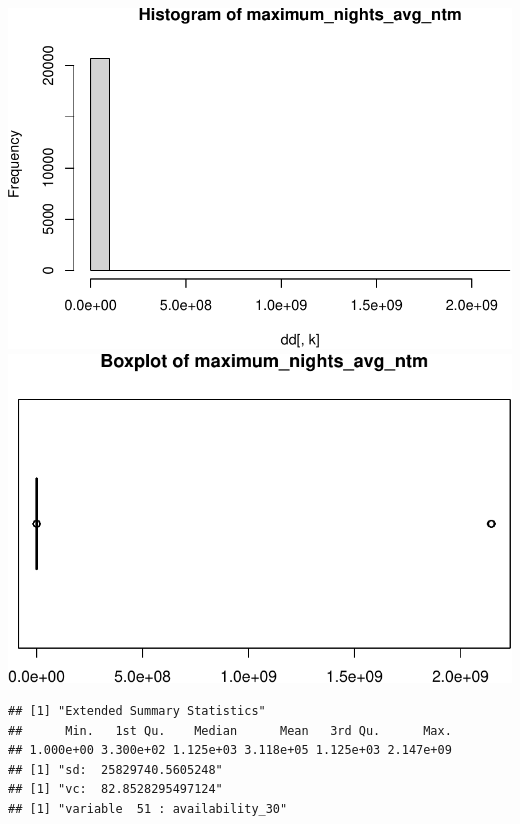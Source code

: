 \includegraphics{anal_files/figure-latex/unnamed-chunk-7-30.pdf}
\includegraphics{anal_files/figure-latex/unnamed-chunk-7-31.pdf}

\begin{verbatim}
## [1] "Extended Summary Statistics"
##      Min.   1st Qu.    Median      Mean   3rd Qu.      Max. 
## 1.000e+00 3.300e+02 1.125e+03 3.118e+05 1.125e+03 2.147e+09 
## [1] "sd:  25829740.5605248"
## [1] "vc:  82.8528295497124"
## [1] "variable  51 : availability_30"
\end{verbatim}

